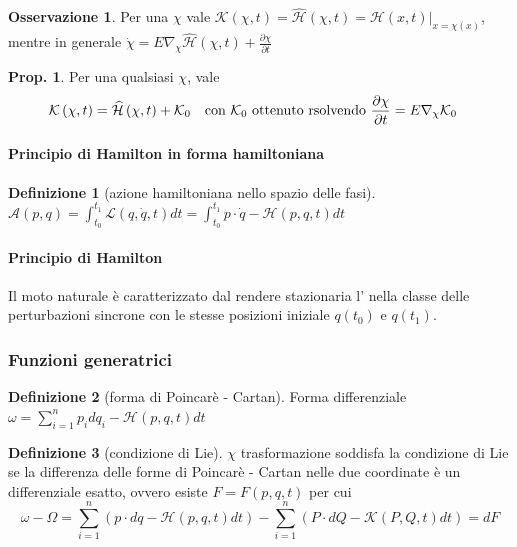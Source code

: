 \documentclass[a4paper,10pt]{article}
\theoremstyle{definition}
\theoremstyle{indentdefinition}
\newtheorem{defn}{Definizione}[section]
\theoremstyle{indenttheorem}
\newtheorem{prop}{Prop.}
\theoremstyle{myremark}
\newtheorem*{rem*}{Osservazione}
\theoremstyle{indentgeneral}
\begin{document}
\begin{rem*}
Per una  $\chi$
vale $\mathcal{K}\left(\chi,t\right)=\widehat{\mathcal{H}}\left(\chi,t\right)=\left.\mathcal{H}\left(x,t\right)\right|_{x=\chi\left(x\right)}$,
mentre in generale $\dot{\chi}=E\nabla_{\chi}\widehat{\mathcal{H}}\left(\chi,t\right)+\frac{\partial\chi}{\partial t}$
\end{rem*}
\begin{prop}
Per una  qualsiasi $\chi$,
vale
\begin{align*}
\mathcal{K}\left(\chi,t\right) & =\widehat{\mathcal{H}}\left(\chi,t\right)+\mathcal{K}_{0} & \text{con \ensuremath{\mathcal{K}_{0}} ottenuto rsolvendo } & \frac{\partial\chi}{\partial t}=E\nabla_{\chi}\mathcal{K}_{0}
\end{align*}
\end{prop}


\paragraph{Principio di Hamilton in forma hamiltoniana}
\begin{defn}[azione hamiltoniana nello spazio delle fasi]
\label{def:azione-hamiltoniana-spazio-fasi}$\mathcal{A}\left(p,q\right)=\int_{t_{0}}^{t_{1}}\mathcal{L}\left(q,\dot{q},t\right)dt=\int_{t_{0}}^{t_{1}}p\cdot\dot{q}-\mathcal{H}\left(p,q,t\right)dt $
\end{defn}


\paragraph{Principio di Hamilton}

Il moto naturale è caratterizzato dal rendere stazionaria l'
nella classe delle perturbazioni sincrone con le stesse posizioni
iniziale $q\left(t_{0}\right)$ e $q\left(t_{1}\right)$.

\subsubsection{Funzioni generatrici}
\begin{defn}[forma di Poincarè - Cartan]
\label{def:forma-Poincare-Cartan}Forma differenziale $\omega=\sum_{i=1}^{n}p_{i}dq_{i}-\mathcal{H}\left(p,q,t\right)dt$
\end{defn}

\begin{defn}[condizione di Lie]
\label{def:condizione-di-Lie}$\chi$ trasformazione soddisfa la
condizione di Lie se la differenza delle forme di Poincarè - Cartan
nelle due coordinate è un differenziale esatto, ovvero esiste $F=F\left(p,q,t\right)$
per cui
\[
\omega-\Omega=\sum_{i=1}^n\left(p\cdot dq-\mathcal{H}\left(p,q,t\right)dt\right)-\sum_{i=1}^n\left(P\cdot dQ-\mathcal{K}\left(P,Q,t\right)dt\right)=dF
\]
\end{defn}
\end{document}
